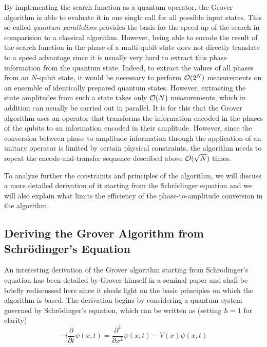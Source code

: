 By implementing the search function as a quantum operator, the Grover algorithm is able to evaluate it in one single call for all possible input states. This so-called {\it quantum parallelism} provides the basis for the speed-up of the search in comparision to a classical algorithm. However, being able to encode the result of the search function in the phase of a multi-qubit state does not directly translate to a speed advantage since it is usually very hard to extract this phase information from the quantum state. Indeed, to extract the values of all phases from an $N$-qubit state, it would be necessary to perform $\begin{mathcal}O(2^N)\end{mathcal}$ measurements on an ensemble of identically prepared quantum states. However, extracting the state amplitudes from such a state takes only $\begin{mathcal}O\end{mathcal}(N)$ measurements, which in addition can usually be carried out in parallel. It is for this that the Grover algorithm uses an operator that transforms the information encoded in the phases of the qubits to an information encoded in their amplitude. However, since the conversion between phase to amplitude information through the application of an unitary operator is limited by certain physical constraints, the algorithm needs to repeat the encode-and-transfer sequence described above $\begin{mathcal}O(\sqrt{N})\end{mathcal}$ times. 

\smallskip

To analyze further the constraints and principles of the algorithm, we will discuss a more detailed derivation of it starting from the Schrödinger equation and we will also explain what limits the efficiency of the phase-to-amplitude conversion in the algorithm.

\subsection{Deriving the Grover Algorithm from Schrödinger's Equation}


An interesting derivation of the Grover algorithm starting from Schrödinger's equation has been detailed by Grover himself in a seminal paper \citep{grover_schrodingers_2001} and shall be briefly rediscussed here since it sheds light on the basic principles on which the algorithm is based. The derivation begins by considering a quantum system governed by Schrödinger's equation, which can be written as (setting $\hbar = 1$ for clarity)
%
\begin{equation}
-i\frac{\partial}{\partial t}\psi(x,t) = \frac{\partial^2}{\partial x^2}\psi(x,t)-V(x)\psi(x,t) \label{eq:grover_derivation}
\end{equation}
%

